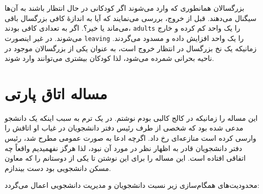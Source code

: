 \documentclass{book}
\begin{document}
    بزرگسالان همانطوری که وارد می‌شوند اگر کودکانی در حال انتظار باشند به آن‌ها سیگنال می‌دهند. قبل از خروج، بررسی می‌نمایند که آیا به اندازهٔ کافی بزرگسال 
    باقی می‌ماند یا خیر؟. اگر به تعدادی کافی بودند، {\tt adults} را یک واحد کم کرده و خارج می‌شوند. در غیر اینصورت {\tt leaving} را یک واحد افزایش 
    داده و مسدود می‌گردند. زمانیکه یک نخ بزرگسال در انتظار خروج است، به عنوان یکی از بزرگسالان موجود در ناحیه بحرانی شمرده می‌شود، لذا کودکان 
    بیشتری می‌توانند وارد شوند.     


\newpage
\section{مساله اتاق پارتی}

    این مساله را زمانیکه در کالج کالبی بودم نوشتم. در یک ترم  به سبب اینکه یک دانشجو مدعی شده بود که شخصی از طرف رئیس دفتر دانشجویان 
    در غیاب او اتاقش را وارسی کرده است منازعه‌ای رخ داد. اگرچه ادعا به صورت عمومی مطرح شد، رئیس دفتر دانشجویان قادر به اظهار نظر در مورد آن نبود، 
    لذا هرگز نفهمیدیم واقعاً چه اتفاقی افتاده است. این مساله را برای این نوشتن تا یکی از دوستانم را که معاون مسکن دانشجویی بود دست بیندازم. 

    محدودیت‌های همگام‌سازی زیر نسبت دانشجویان و مدیریت دانشجویی اعمال می‌گردد: 
\end{document}
